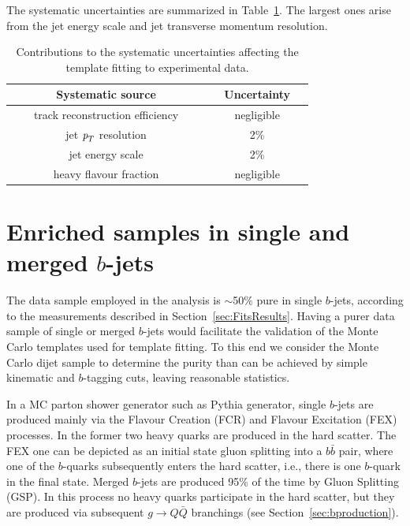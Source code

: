 The systematic uncertainties are summarized in Table~\ref{tb:systematicsfits}. The largest ones arise from the jet energy scale and jet transverse momentum resolution.
\begin{table}[!hbt] %
\renewcommand{\arraystretch}{1.2}
\centering
\begin{tabular}{ | c | c |}
\hline
  ~~~~~~~Systematic source~~~~~~~ &~~Uncertainty~~\\ \hline
  track reconstruction efficiency  &    negligible        \\ 
  jet ${\emph{p}_{T}}$ resolution  &    2\%        \\  
  jet energy scale  &    2\%        \\ 
  heavy flavour fraction  &    negligible        \\ \hline 
\end{tabular}
\caption{Contributions to the systematic uncertainties affecting the template fitting to experimental data.}
\label{tb:systematicsfits}
\end{table}




\section{Enriched samples in single and merged $b$-jets}\label{sec:Enriched}

The data sample employed in the analysis is $\sim$50\% pure in single $b$-jets, according to the measurements described in Section~\ref{sec:FitsResults}. Having a purer data sample of single or  merged $b$-jets would facilitate the validation of the Monte Carlo templates used for template fitting. To this end we consider the Monte Carlo dijet sample to determine the purity than can be achieved by simple kinematic and $b$-tagging cuts, leaving reasonable statistics.

In a MC parton shower generator such as {\sc Pythia} generator, single $b$-jets are produced mainly via the Flavour Creation (FCR) and Flavour Excitation (FEX) processes.  In the former two heavy quarks are produced in the hard scatter. The FEX one can be depicted as an initial state gluon splitting into a $b\bar{b}$ pair, where one of the $b$-quarks subsequently enters the hard scatter, i.e., there is one $b$-quark in the final state.
Merged $b$-jets are produced 95\% of the time by Gluon Splitting (GSP). In this process no heavy quarks participate in the hard scatter, but they are produced via subsequent $g \rightarrow Q\bar{Q}$ branchings (see Section~\ref{sec:bproduction}).

